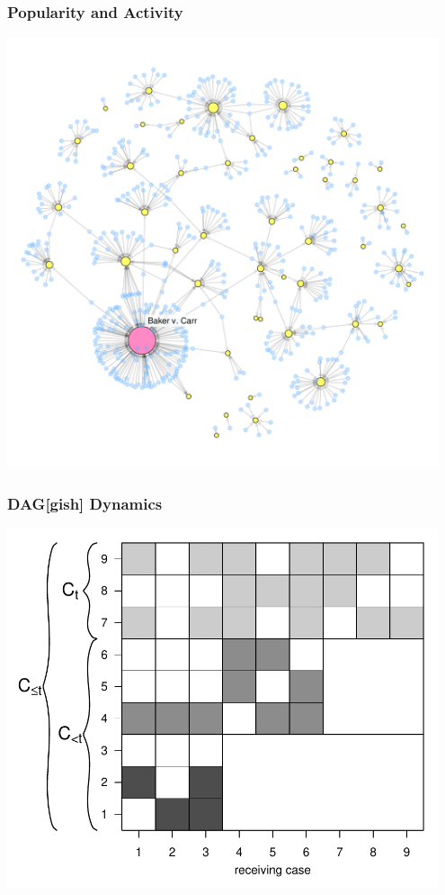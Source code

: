 \documentclass[handout]{beamer}
\begin{document}
\begin{frame} \frametitle{Popularity and Activity}

\centering

\includegraphics[width = 0.95\textwidth,trim= 0cm 3cm 6cm 8cm,clip=true ]{../../../NetworkVisualizations/citations_pop.pdf}


\end{frame}



\begin{frame} \frametitle{DAG[gish] Dynamics}
\centering

\includegraphics[width = 0.95\textwidth,trim= 0cm 0cm 0cm 1.5cm,clip=true  ]{../../../Tex/images/daggish.pdf}

\end{frame}
\end{document}
